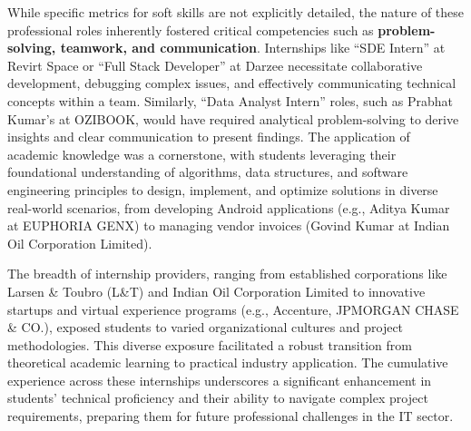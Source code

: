 \documentclass[11pt,a4paper]{article}
\newenvironment{card}{
    \begin{tcolorbox}[
        enhanced,
        colback=cardback,
        colframe=border,
        sharp corners,
        boxrule=0.5pt,
        drop shadow,
        shadow xshift=1mm,
        shadow yshift=-1mm,
        shadow color=border!50,
        boxsep=3mm,
        left=5mm, right=5mm, top=5mm, bottom=5mm,
        width=\textwidth,
        nobeforeafter
    ]
}{\end{tcolorbox}}
\begin{document}
\begin{card}
    While specific metrics for soft skills are not explicitly detailed, the nature of these professional roles inherently fostered critical competencies such as \textbf{problem-solving, teamwork, and communication}. Internships like ``SDE Intern'' at Revirt Space or ``Full Stack Developer'' at Darzee necessitate collaborative development, debugging complex issues, and effectively communicating technical concepts within a team. Similarly, ``Data Analyst Intern'' roles, such as Prabhat Kumar's at OZIBOOK, would have required analytical problem-solving to derive insights and clear communication to present findings. The application of academic knowledge was a cornerstone, with students leveraging their foundational understanding of algorithms, data structures, and software engineering principles to design, implement, and optimize solutions in diverse real-world scenarios, from developing Android applications (e.g., Aditya Kumar at EUPHORIA GENX) to managing vendor invoices (Govind Kumar at Indian Oil Corporation Limited).

    The breadth of internship providers, ranging from established corporations like Larsen \& Toubro (L\&T) and Indian Oil Corporation Limited to innovative startups and virtual experience programs (e.g., Accenture, JPMORGAN CHASE \& CO.), exposed students to varied organizational cultures and project methodologies. This diverse exposure facilitated a robust transition from theoretical academic learning to practical industry application. The cumulative experience across these internships underscores a significant enhancement in students' technical proficiency and their ability to navigate complex project requirements, preparing them for future professional challenges in the IT sector.
\end{card}

\vspace{0.5cm}
\end{document}
